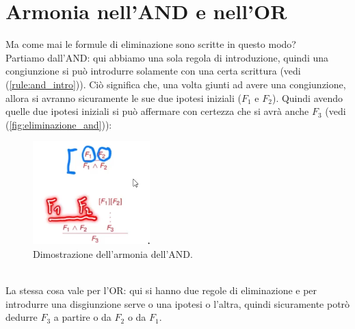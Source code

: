 \documentclass[12pt]{article}
\begin{document}
\section{Armonia nell'AND e nell'OR}
\label{sec:and_or_armony}
Ma come mai le formule di eliminazione sono scritte in questo modo?\\
Partiamo dall'AND: qui abbiamo una sola regola di introduzione, quindi una congiunzione si può introdurre solamente con una certa scrittura (vedi (\ref{rule:and_intro})). Ciò significa che, una volta giunti ad avere una congiunzione, allora si avranno sicuramente le sue due ipotesi iniziali ($F_1$ e $F_2$). Quindi avendo quelle due ipotesi iniziali si può affermare con certezza che si avrà anche $F_3$ (vedi (\ref{fig:eliminazione_and})):
\begin{figure}[!htb]
    \centering
    \includegraphics[width=.9\linewidth,height=.40\textheight,keepaspectratio]{logica_proposizionale/introduzione/armonia_and.PNG} %
    \begin{center}
        \caption{\label{fig:armonia_and}Dimostrazione dell'armonia dell'AND.} %
    \end{center}
\end{figure}\\
La stessa cosa vale per l'OR: qui si hanno due regole di eliminazione e per introdurre una disgiunzione serve o una ipotesi o l'altra, quindi sicuramente potrò dedurre $F_3$ a partire o da $F_2$ o da $F_1$.

\pagebreak
\end{document}
